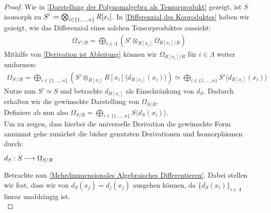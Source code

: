 \documentclass[10pt,a4paper]{report}
\newcommand{\functionfront}[3]{\nolinebreak{#1:#2 \longrightarrow #3}}
\newcommand{\divR}[2]{\Omega_{#1/#2}}
\newcommand{\divf}[1]{d_{#1}}
\newcommand{\Tensor}[3]{#1 \otimes_{#2} #3}
\newcommand{\tensor}[3]{#1 \otimes #3}
\newcommand*{\defeq}{\mathrel{\vcenter{\baselineskip0.5ex \lineskiplimit0pt
                     \hbox{\scriptsize.}\hbox{\scriptsize.}}}%
                     =}
\begin{document}
\begin{proof}
Wie in \cref{Darstellung der Polynomalgebra als Tensorprodukt} gezeigt, ist $S$ isomorph zu $S' \defeq \bigotimes_{i \in \lbrace 1,...,n \rbrace} R[x_i]$. In \cref{Differenzial des Koproduktes} haben wir gezeigt, wie das Differenzial eines solchen Tensorproduktes aussieht:
\begin{gather*}
\divR{S'}{R} = \bigoplus_{i \in \Lambda} (\Tensor{S'}{R[x_i]}{\divR{R[x_i]}{R}})
\end{gather*}
Mithilfe von \cref{Derivation ist Ableitung} können wir ${\divR{R[x_i]}{R}}$ für $i \in \Lambda$ weiter umformen:
\begin{gather*}
\divR{S'}{R} = \bigoplus_{i \in \lbrace 1,...,n \rbrace} (\Tensor{S'}{R[x_i]}{R[x_i]\langle \divf{R[x_i]}(x_i) \rangle})
\simeq \bigoplus_{i \in \lbrace 1,...,n \rbrace} S' \langle \divf{R[x_i]}(x_i) \rangle 
\end{gather*}
Nutze nun $S' \simeq S$ und betrachte $\divf{R[x_i]}$ als Einschränkung von $\divf{S}$. Dadurch erhalten wir die gewünschte Darstellung von $\divR{S}{R}$.\\
Definiere ab nun also $\divR{S}{R} = \bigoplus_{i \in \lbrace 1,...,n \rbrace} S \langle \divf{S}(x_i) \rangle$.\\
Um zu zeigen, dass hierbei die universelle Derivation die gewünschte Form annimmt gehe zunächst die bisher genutzten Derivationen und Isomorphismen durch:
\begin{center}
$\functionfront{\divf{S}}{S}{\divR{S}{R}}$
\end{center}
Betrachte nun \cref{Mehrdimmensionales Algebraisches Differentieren}. Dabei stellen wir fest, dass wir von $\divf{S}(x_j) = \divf{j}(x_j)$ ausgehen können, da $\lbrace \divf{S}(x_i) \rbrace_{i \in \Lambda}$ linear unabhängig ist.\\

\end{proof}
\end{document}
